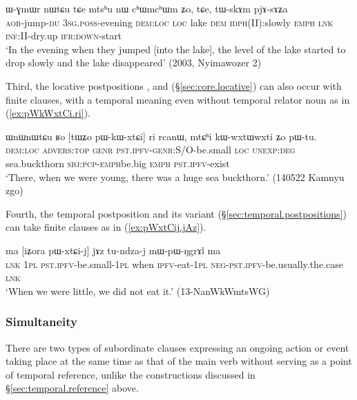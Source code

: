  \begin{exe}
\ex \label{ex:pWnWmdarndZi.WGmWr}
 ɯ-ɣmɯr nɯtɕu tɕe  mtsʰu nɯ cʰɯmcʰɯm ʑo, tɕe, tɯ-skɤm pjɤ-sɤʑa \\
\textsc{aor}-jump-\textsc{du} \textsc{3sg}.\textsc{poss}-evening \textsc{dem}:\textsc{loc} \textsc{loc} lake \textsc{dem} \textsc{idph}(II):slowly \textsc{emph} \textsc{lnk} \textsc{inf}:II-dry.up \textsc{ifr}:\textsc{down}-start \\
\glt `In the evening when they jumped [into the lake], the level of the lake started to drop slowly and the lake disappeared' (2003, Nyimawozer 2)
\end{exe}

Third, the locative postpositions ,  and  (§\ref{sec:core.locative}) can also occur with finite clauses, with a temporal meaning even without temporal relator noun as in (\ref{ex:pWkWxtCi.ri}).

 \begin{exe}
\ex \label{ex:pWkWxtCi.ri}
\gll  ɯnɯnɯtɕu ʁo [tɯʑo pɯ-kɯ-xtɕi] ri rcanɯ, mtɕʰi kɯ-wxtɯ\redp{}wxti ʑo pɯ-tu. \\
\textsc{dem}:\textsc{loc} \textsc{advers}:\textsc{top} \textsc{genr} \textsc{pst}.\textsc{ipfv}-\textsc{genr}:S/O-be.small \textsc{loc} \textsc{unexp}:\textsc{deg} sea.buckthorn \textsc{sbj}:\textsc{pcp}-\textsc{emph}\redp{}be.big \textsc{emph} \textsc{pst}.\textsc{ipfv}-exist \\
\glt `There, when we were young, there was a huge sea buckthorn.' (140522 Kamnyu zgo)
 \end{exe}
 
Fourth, the temporal postposition    and its variant  (§\ref{sec:temporal.postpositions}) can take finite clauses as in (\ref{ex:pWxtCij.jAz}).
    
 \begin{exe}
\ex \label{ex:pWxtCij.jAz}
\gll ma [iʑora pɯ-xtɕi-j] jɤz  tu-ndza-j mɯ-pɯ-ŋgrɤl ma \\
\textsc{lnk} \textsc{1pl} \textsc{pst}.\textsc{ipfv}-be.small-\textsc{1pl} when \textsc{ipfv}-eat-\textsc{1pl} \textsc{neg}-\textsc{pst}.\textsc{ipfv}-be.usually.the.case \textsc{lnk} \\
\glt `When we were little, we did not eat it.' (13-NanWkWmtsWG)
 \end{exe}

 
\subsubsection{Simultaneity} \label{sec:simultaneity}
 There are two types of subordinate clauses expressing an ongoing action or event taking place at the same time as that of the main verb without serving as a point of temporal reference, unlike the constructions discussed in §\ref{sec:temporal.reference} above.

